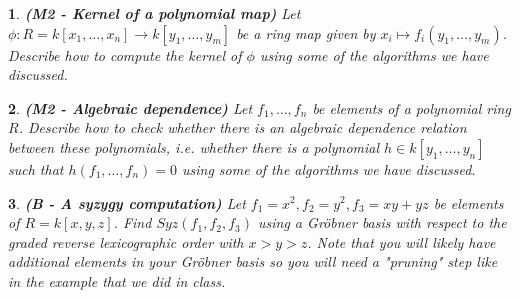 \documentclass[11pt]{article}
\theoremstyle{problem}
\newtheorem{p}{}
\newcommand{\GB}{Gr\"obner basis }
\begin{document}
\pagestyle{empty}

\thispagestyle{myheadings}


\bigskip 

\bigskip 

\bigskip 



 \begin{p} {\bf (M2 - Kernel of a polynomial map)}
 Let $\phi:R=k[x_1,\ldots,x_n]\to k[y_1,\ldots,y_m]$ be a ring map given by  $x_i\mapsto f_i(y_1,\ldots,y_m)$.
 Describe how to compute  the kernel of $\phi$ using some of the algorithms we have discussed. 
\end{p}



 \begin{p} {\bf (M2 - Algebraic dependence)}
 Let $f_1,\ldots,f_n$ be elements of a polynomial ring $R$.  Describe how to check whether there is an algebraic dependence relation between these polynomials, i.e. whether there is a polynomial $h\in k[y_1,\ldots,y_n]$ such that $h(f_1,\ldots,f_n)=0$  using some of the algorithms we have discussed. 
\end{p}

\begin{p} {\bf (B - A syzygy computation)}
Let $f_1=x^2, f_2=y^2, f_3=xy+yz$ be elements of $R=k[x,y,z]$. Find $Syz(f_1,f_2,f_3)$ using a \GB with respect to the graded reverse lexicographic order with $x>y>z$. Note that you will likely have additional elements in your \GB so you will need a "pruning" step like in the example that we did in class.
\end{p}

\end{document}

